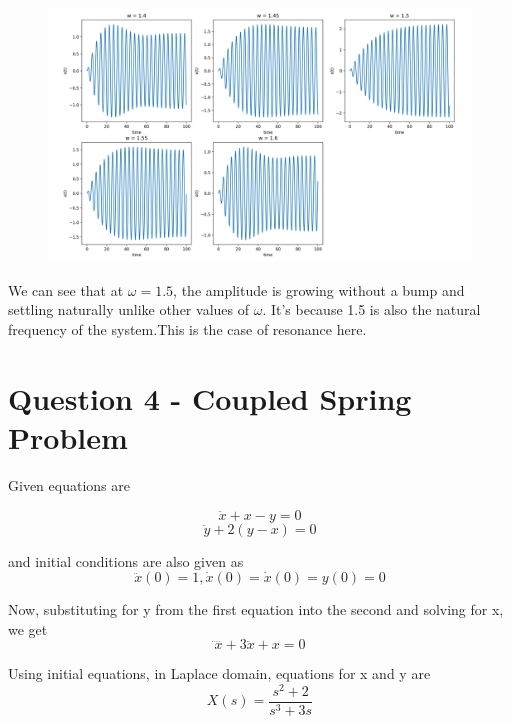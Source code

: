 \documentclass[12pt, a4paper]{report}
\begin{document}
\begin{figure}[!tbh]
   	\centering
   	\includegraphics[scale=0.5]{Q3.png}
 \end{figure} 
 
 We can see that at $\omega = 1.5$, the amplitude is growing without a bump and settling naturally unlike other values of $\omega $. It's because 1.5 is also the natural frequency of the system.This is the case of resonance here.


 \section*{Question 4 - Coupled Spring Problem}
 Given equations are

 \begin{equation}
  \ddot x + x - y = 0
\end{equation}
\begin{equation}
  \ddot y + 2(y- x) = 0
\end{equation}

and initial conditions are also given as
\begin{equation}
  \ddot x(0) = 1, \dot x(0) =  \dot x(0) = y(0) = 0
\end{equation}
	
Now, substituting for y from the first equation into the second and solving for x, we get
\begin{equation}
  \ddddot x + 3 \ddot x + x = 0
\end{equation}

Using initial equations, in Laplace domain, equations for x and y are
\begin{equation}
  X(s)= \frac{s^2+2}{s^3+3s}
\end{equation}
\end{document}
